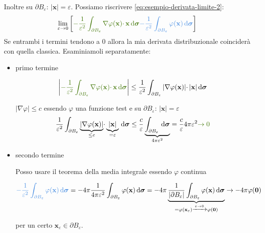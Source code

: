 \documentclass[10pt,a4paper,twoside,openright]{book}
\newcommand{\x}{\mathbf{x}}
\newcommand{\zer}{\mathbf{0}}
\newcommand{\sigg}{\bm{\sigma}}
\newcommand{\de}{\,\mathrm d}
\newcommand{\dsig}{\de \sigg}
\begin{document}
Inoltre su $\displaystyle \partial B_{\varepsilon }$: $\displaystyle | \x| =\varepsilon $. Possiamo riscrivere \eqref{eq:esempio-derivata-limite-2}:
\begin{equation*}
    \lim _{\varepsilon \rightarrow 0}\left[\textcolor[rgb]{0.25,0.46,0.02}{-\frac{1}{\varepsilon ^{2}}\int _{\partial B_{\varepsilon }} \nabla \varphi (\x) \cdotp \x \dsig }\textcolor[rgb]{0.29,0.56,0.89}{-\frac{1}{\varepsilon ^{2}}\int _{\partial B_{\varepsilon }} \varphi (\x) \dsig }\right]
\end{equation*}
Se entrambi i termini tendono a $0$ allora la mia derivata distribuzionale coinciderà con quella classica. Esaminiamoli separatamente:
\begin{itemize}
    \item primo termine

          \begin{equation*}
              \left| \textcolor[rgb]{0.25,0.46,0.02}{-\frac{1}{\varepsilon ^{2}}\int _{\partial B_{\varepsilon }} \nabla \varphi (\x) \cdotp \x \dsig }\right| \leqslant \frac{1}{\varepsilon ^{2}}\int _{\partial B_{\varepsilon }}| \nabla \varphi (\x)| \cdotp | \x| \dsig
          \end{equation*}

          $\displaystyle | \nabla \varphi | \leqslant c$ essendo $\displaystyle \varphi $ una funzione test e su $\displaystyle \partial B_{\varepsilon }$: $\displaystyle | \x| =\varepsilon $
          \begin{equation*}
              \frac{1}{\varepsilon ^{2}}\int _{\partial B_{\varepsilon }}\underbrace{| \nabla \varphi (\x)| }_{\leqslant c} \cdotp \underbrace{| \x| }_{=\varepsilon } \dsig \leqslant \frac{c}{\varepsilon }\underbrace{\int _{\partial B_{\varepsilon }} \dsig }_{4\pi \varepsilon ^{2}} =\frac{c}{\varepsilon } 4\pi \varepsilon ^{2}\textcolor[rgb]{0.25,0.46,0.02}{\rightarrow 0}
          \end{equation*}
    \item secondo termine

          Posso usare il teorema della media integrale essendo $\displaystyle \varphi $ continua

          \begin{equation*}
              \textcolor[rgb]{0.29,0.56,0.89}{-\frac{1}{\varepsilon ^{2}}\int _{\partial B_{\varepsilon }} \varphi (\x) \dsig } =-4\pi \frac{1}{4\pi \varepsilon ^{2}}\int _{\partial B_{\varepsilon }} \varphi (\x) \dsig =-4\pi \underbrace{\frac{1}{| \partial B_{\varepsilon }| }\int _{\partial B_{\varepsilon }} \varphi (\x) \dsig }_{=\varphi (\x_{\varepsilon })\xrightarrow{\varepsilon \rightarrow 0} \varphi (\zer)}\rightarrow -4\pi \varphi (\zer)
          \end{equation*}

          per un certo $\displaystyle \x_{\varepsilon } \in \partial B_{\varepsilon }$.
\end{itemize}
\end{document}
